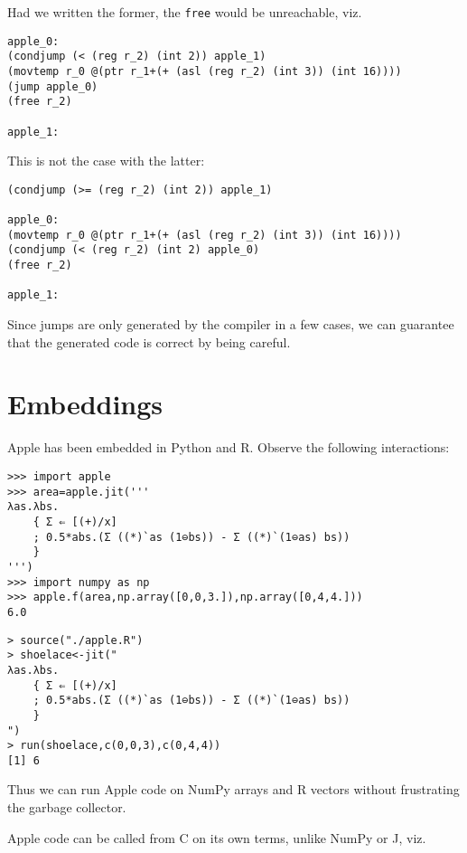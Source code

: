 \documentclass[acmsmall,screen,anonymous,nonacm]{acmart}
\begin{document}
Had we written the former, the {\tt free} would be unreachable, viz.

\begin{verbatim}
apple_0:
(condjump (< (reg r_2) (int 2)) apple_1)
(movtemp r_0 @(ptr r_1+(+ (asl (reg r_2) (int 3)) (int 16))))
(jump apple_0)
(free r_2)

apple_1:
\end{verbatim}

This is not the case with the latter:

\begin{verbatim}
(condjump (>= (reg r_2) (int 2)) apple_1)

apple_0:
(movtemp r_0 @(ptr r_1+(+ (asl (reg r_2) (int 3)) (int 16))))
(condjump (< (reg r_2) (int 2) apple_0)
(free r_2)

apple_1:
\end{verbatim}

Since jumps are only generated by the compiler in a few cases, we can guarantee that the generated code is correct by being careful.

\section{Embeddings}

Apple has been embedded in Python and R. Observe the following interactions:

\begin{verbatim}
>>> import apple
>>> area=apple.jit('''
λas.λbs.
    { Σ ⇐ [(+)/x]
    ; 0.5*abs.(Σ ((*)`as (1⊖bs)) - Σ ((*)`(1⊖as) bs))
    }
''')
>>> import numpy as np
>>> apple.f(area,np.array([0,0,3.]),np.array([0,4,4.]))
6.0
\end{verbatim}

\begin{verbatim}
> source("./apple.R")
> shoelace<-jit("
λas.λbs.
    { Σ ⇐ [(+)/x]
    ; 0.5*abs.(Σ ((*)`as (1⊖bs)) - Σ ((*)`(1⊖as) bs))
    }
")
> run(shoelace,c(0,0,3),c(0,4,4))
[1] 6
\end{verbatim}

Thus we can run Apple code on NumPy arrays and R vectors without frustrating the garbage collector.

Apple code can be called from C on its own terms, unlike NumPy or J, viz.
\end{document}
